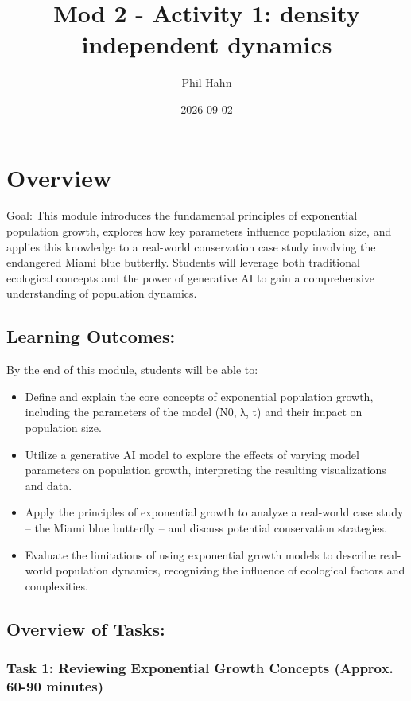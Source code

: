 \documentclass[
]{article}
\title{Mod 2 - Activity 1: density independent dynamics}
\author{Phil Hahn}
\date{2026-09-02}
\providecommand{\tightlist}{%
  \setlength{\itemsep}{0pt}\setlength{\parskip}{0pt}}
\begin{document}
\maketitle


\section{Overview}\label{overview}

Goal: This module introduces the fundamental principles of exponential
population growth, explores how key parameters influence population
size, and applies this knowledge to a real-world conservation case study
involving the endangered Miami blue butterfly. Students will leverage
both traditional ecological concepts and the power of generative AI to
gain a comprehensive understanding of population dynamics.

\subsection{Learning Outcomes:}\label{learning-outcomes}

By the end of this module, students will be able to:

\begin{itemize}
\tightlist
\item
  Define and explain the core concepts of exponential population growth,
  including the parameters of the model (N0, λ, t) and their impact on
  population size.
\item
  Utilize a generative AI model to explore the effects of varying model
  parameters on population growth, interpreting the resulting
  visualizations and data.
\item
  Apply the principles of exponential growth to analyze a real-world
  case study -- the Miami blue butterfly -- and discuss potential
  conservation strategies.
\item
  Evaluate the limitations of using exponential growth models to
  describe real-world population dynamics, recognizing the influence of
  ecological factors and complexities.
\end{itemize}

\subsection{Overview of Tasks:}\label{overview-of-tasks}

\subsubsection{Task 1: Reviewing Exponential Growth Concepts (Approx.
60-90
minutes)}\label{task-1-reviewing-exponential-growth-concepts-approx.-60-90-minutes}
\end{document}
